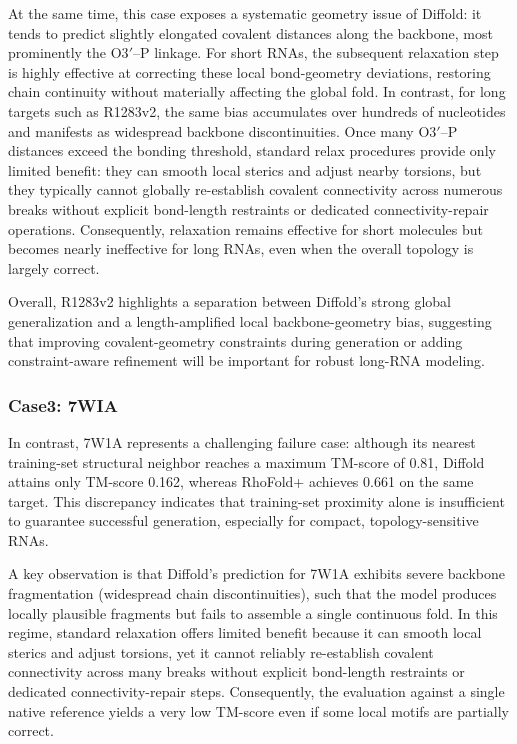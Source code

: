 At the same time, this case exposes a systematic geometry issue of Diffold: it tends to predict slightly elongated covalent distances along the backbone, most prominently the O3$'$\!--P linkage. For short RNAs, the subsequent relaxation step is highly effective at correcting these local bond-geometry deviations, restoring chain continuity without materially affecting the global fold. In contrast, for long targets such as R1283v2, the same bias accumulates over hundreds of nucleotides and manifests as widespread backbone discontinuities. Once many O3$'$\!--P distances exceed the bonding threshold, standard relax procedures provide only limited benefit: they can smooth local sterics and adjust nearby torsions, but they typically cannot globally re-establish covalent connectivity across numerous breaks without explicit bond-length restraints or dedicated connectivity-repair operations. Consequently, relaxation remains effective for short molecules but becomes nearly ineffective for long RNAs, even when the overall topology is largely correct.

Overall, R1283v2 highlights a separation between Diffold's strong global generalization and a length-amplified local backbone-geometry bias, suggesting that improving covalent-geometry constraints during generation or adding constraint-aware refinement will be important for robust long-RNA modeling.



\subsubsection{Case3: 7WIA}

In contrast, 7W1A represents a challenging failure case: although its nearest training-set structural neighbor reaches a maximum TM-score of 0.81, Diffold attains only TM-score 0.162, whereas RhoFold+ achieves 0.661 on the same target. This discrepancy indicates that training-set proximity alone is insufficient to guarantee successful generation, especially for compact, topology-sensitive RNAs.

A key observation is that Diffold's prediction for 7W1A exhibits severe backbone fragmentation (widespread chain discontinuities), such that the model produces locally plausible fragments but fails to assemble a single continuous fold. In this regime, standard relaxation offers limited benefit because it can smooth local sterics and adjust torsions, yet it cannot reliably re-establish covalent connectivity across many breaks without explicit bond-length restraints or dedicated connectivity-repair steps. Consequently, the evaluation against a single native reference yields a very low TM-score even if some local motifs are partially correct.

